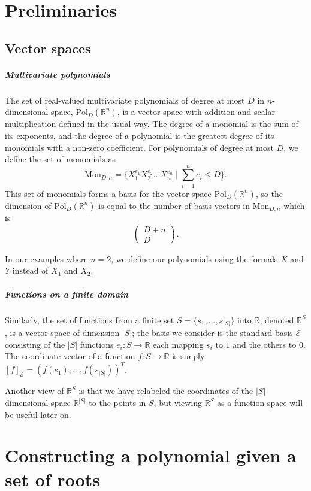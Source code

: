 \documentclass[article,oneside,a4paper]{memoir}
\newcommand{\reals}{\mathbb{R}}
\newcommand{\Pol}[2]{\mathrm{Pol}_#1(\reals^#2)}
\newcommand{\PolDn}{\Pol Dn}
\newcommand{\Mon}[2]{\mathrm{Mon}_{#1,#2}}
\newcommand{\MonDn}{\Mon Dn}
\newcommand{\StoR}{\reals^S}
\newcommand{\StandardBasis}{\mathcal{E}}
\newcommand{\T}{T}
\newcommand{\Ssz}{|S|}
\begin{document}
\chapter{Preliminaries}

\section{Vector spaces}

\paragraph{Multivariate polynomials}
The set of real-valued multivariate polynomials of degree at most $D$ in
$n$-dimensional space, $\PolDn$, is a vector space with addition and scalar
multiplication defined in the usual way.
The degree of a monomial is the sum of its exponents,
and the degree of a polynomial is the greatest degree of its monomials
with a non-zero coefficient.
For polynomials of degree at most $D$, we define the set of monomials as
\[\MonDn = \{X_1^{e_1} X_2^{e_2} \dots X_n^{e_n} \mid \sum_{i=1}^n e_i \leq D\}.\]
This set of monomials forms a basis for the vector space $\PolDn$,
so the dimension of $\PolDn$ is equal to the number of basis vectors in $\MonDn$ which is
\[\begin{pmatrix} D + n \\ D \end{pmatrix}.\]

In our examples where $n = 2$, we define our polynomials using the formals $X$
and $Y$ instead of $X_1$ and $X_2$.

\paragraph{Functions on a finite domain}
Similarly, the set of functions from a finite set
$S = \{s_1, \dots, s_{\Ssz}\}$ into $\reals$,
denoted $\StoR$, is a vector space of dimension $\Ssz$;
the basis we consider is the standard basis $\StandardBasis$
consisting of the $\Ssz$ functions $e_i : S \to \reals$
each mapping $s_i$ to $1$ and the others to $0$.
The coordinate vector of a function $f : S \to \reals$
is simply $[f]_{\StandardBasis} = ( f(s_1), \dots, f(s_{\Ssz}) )^\T$.

Another view of $\StoR$ is that we have relabeled
the coordinates of the $\Ssz$-dimensional space $\reals^{\Ssz}$
to the points in $S$,
but viewing $\StoR$ as a function space will be useful later on.

\chapter{Constructing a polynomial given a set of roots}
\end{document}
